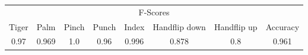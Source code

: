 \documentclass{standalone}
\begin{document}
 
 \begin{tabular}{|c|c|c|c|c|c|c ||c|}
\cline{1-8}\multicolumn{8}{|c|}{F-Scores} \\ 
\cline{1-8}Tiger & Palm & Pinch & Punch & Index & Handflip down & Handflip up & Accuracy\\ 
\cline{1-8}0.97 & 0.969 & 1.0 & 0.96 & 0.996 & 0.878 & 0.8 & 0.961\\ 
 \cline{1-8}\hline \end{tabular}
 
\end{document}
